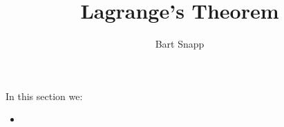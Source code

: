 \documentclass{ximera}
\author{Bart Snapp}
\title{Lagrange's Theorem}
\begin{document}
\begin{abstract}
\end{abstract}
\maketitle
In this section we:

\begin{itemize}
\item 
\end{itemize}
\end{document}
